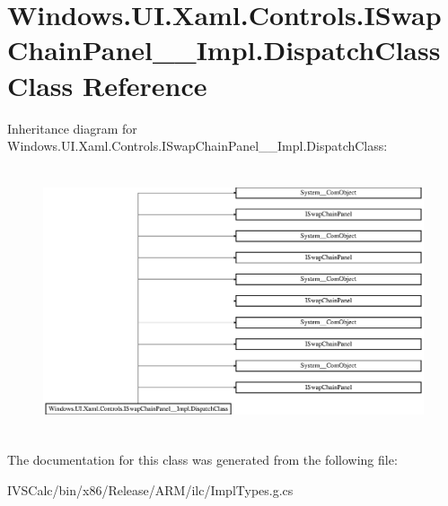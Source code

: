 \hypertarget{class_windows_1_1_u_i_1_1_xaml_1_1_controls_1_1_i_swap_chain_panel_____impl_1_1_dispatch_class}{}\section{Windows.\+U\+I.\+Xaml.\+Controls.\+I\+Swap\+Chain\+Panel\+\_\+\+\_\+\+Impl.\+Dispatch\+Class Class Reference}
\label{class_windows_1_1_u_i_1_1_xaml_1_1_controls_1_1_i_swap_chain_panel_____impl_1_1_dispatch_class}
Inheritance diagram for Windows.\+U\+I.\+Xaml.\+Controls.\+I\+Swap\+Chain\+Panel\+\_\+\+\_\+\+Impl.\+Dispatch\+Class\+:\begin{figure}[H]
\begin{center}
\leavevmode
\includegraphics[height=7.877238cm]{class_windows_1_1_u_i_1_1_xaml_1_1_controls_1_1_i_swap_chain_panel_____impl_1_1_dispatch_class}
\end{center}
\end{figure}


The documentation for this class was generated from the following file\+:\begin{DoxyCompactItemize}
\item 
I\+V\+S\+Calc/bin/x86/\+Release/\+A\+R\+M/ilc/Impl\+Types.\+g.\+cs\end{DoxyCompactItemize}
